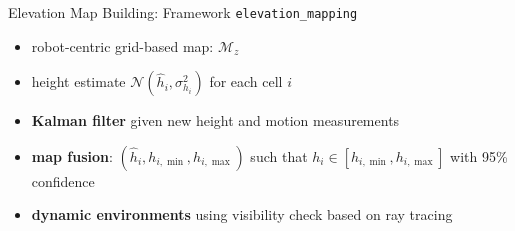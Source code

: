 \documentclass[10pt]{beamer}
\begin{document}
\begin{frame}{Elevation Map Building: Framework}
  \texttt{elevation\_mapping} \cite{Fankhauser2018ProbabilisticTerrainMapping}
  \begin{itemize}
		\item robot-centric grid-based map: $\mathcal{M}_z$
		\item height estimate $\mathcal{N}(\hat{h}_i, \sigma_{h_i}^2)$
				for each cell $i$
		\item \textbf{Kalman filter} given new height and motion measurements
		\item \textbf{map fusion}: $(\hat{h}_i, h_{i,\min}, h_{i,\max})$ such that
				$h_i \in [h_{i,\min}, h_{i,\max}]$ with 95\% confidence
		\item \textbf{dynamic environments} using visibility check based
				on ray tracing
	\end{itemize}
\end{frame}
\end{document}
